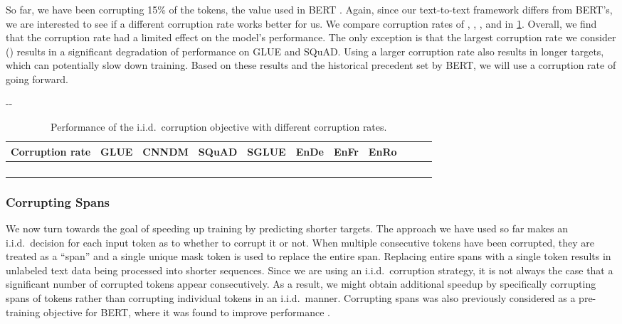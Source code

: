 \documentclass[twoside,11pt]{article}
\newlength{\offsetpage}
\newenvironment{widepage}{\begin{adjustwidth}{-\offsetpage}{-\offsetpage}\addtolength{\textwidth}{2\offsetpage}}{\end{adjustwidth}}
\newcommand{\bsl}{\makebox[0pt][r]{\raisebox{0.05em}{}}}
\begin{document}
So far, we have been corrupting 15\% of the tokens, the value used in BERT \citep{devlin2018bert}.
Again, since our text-to-text framework differs from BERT's, we are interested to see if a different corruption rate works better for us.
We compare corruption rates of , , , and  in \cref{tab:objectives_rate}.
Overall, we find that the corruption rate had a limited effect on the model's performance.
The only exception is that the largest corruption rate we consider () results in a significant degradation of performance on GLUE and SQuAD.
Using a larger corruption rate also results in longer targets, which can potentially slow down training.
Based on these results and the historical precedent set by BERT, we will use a corruption rate of  going forward.

\begin{table}
\footnotesize
\begin{widepage}
\centering
\begin{tabular}{l c c c c c c c c c c}
\toprule
    Corruption rate & GLUE        & CNNDM       & SQuAD       & SGLUE       & EnDe        & EnFr        & EnRo    \\
\midrule
              &  &      &  &      &  &      &  \\
    \bsl      &  &      &  &  &  &  &  \\
              &  &  &  &      &  &  &  \\
              &      &      &      &      &  &  &  \\
\bottomrule
\end{tabular}
\end{widepage}
\caption{
Performance of the i.i.d.\ corruption objective with different corruption rates.
}
\label{tab:objectives_rate}
\end{table}

\subsubsection{Corrupting Spans}
\label{sec:objective_spans}

We now turn towards the goal of speeding up training by predicting shorter targets.
The approach we have used so far makes an i.i.d.\ decision for each input token as to whether to corrupt it or not.
When multiple consecutive tokens have been corrupted, they are treated as a ``span'' and a single unique mask token is used to replace the entire span.
Replacing entire spans with a single token results in unlabeled text data being processed into shorter sequences.
Since we are using an i.i.d.\ corruption strategy, it is not always the case that a significant number of corrupted tokens appear consecutively.
As a result, we might obtain additional speedup by specifically corrupting spans of tokens rather than corrupting individual tokens in an i.i.d.\ manner.
Corrupting spans was also previously considered as a pre-training objective for BERT, where it was found to improve performance \citep{joshi2019spanbert}.
\end{document}
